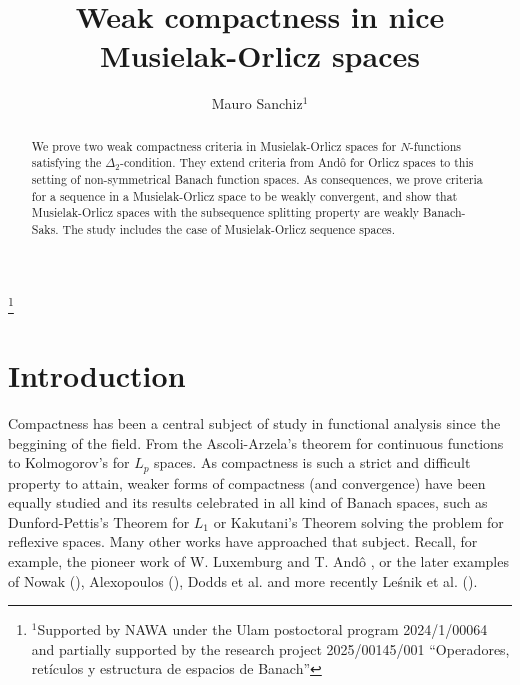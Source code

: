 \documentclass[11pt,a4paper]{amsart}
\begin{document}
\setlength{\baselineskip}{16pt}

\title[Weak compactness in nice Musielak-Orlicz spaces]{Weak compactness in nice Musielak-Orlicz spaces}
\author[M. Sanchiz]{Mauro Sanchiz$^{1}$}
\address{Department of Mathematical Analysis and Applied Mathematics, Faculty of Mathematics, Complutense University of Madrid, 28040 Madrid, Spain.}
\thanks{$^1$Supported by NAWA under the Ulam postoctoral program 2024/1/00064 and partially supported by the research project 2025/00145/001 ``Operadores, retículos y estructura de espacios de Banach''}
\date{}



\begin{abstract}

We prove two weak compactness criteria in Musielak-Orlicz spaces for $N$-functions satisfying the $\Delta_2$-condition. They extend criteria from And\^o for Orlicz spaces to this setting of non-symmetrical Banach function spaces. As consequences, we prove criteria for a sequence in a Musielak-Orlicz space to be weakly convergent, and show that Musielak-Orlicz spaces with the subsequence splitting property are weakly Banach-Saks. The study includes the case of Musielak-Orlicz sequence spaces.

\end{abstract}
\maketitle


\vspace{-10mm}

\section{Introduction}
Compactness has been a central subject of study in functional analysis since the beggining of the field. From the Ascoli-Arzela's theorem for continuous functions to Kolmogorov's for $L_p$ spaces. As compactness is such a strict and difficult property to attain, weaker forms of compactness (and convergence) have been equally studied and its results celebrated in all kind of Banach spaces, such as Dunford-Pettis's Theorem for $L_1$ or Kakutani's Theorem solving the problem for reflexive spaces. Many other works have approached that subject. Recall, for example, the pioneer work of W. Luxemburg \cite{Luxemburg} and T. And\^o \cite{Ando}, or the later examples of Nowak (\cite{Nowak}), Alexopoulos (\cite{Alexopoulos}), Dodds et al. \cite{Dodds} and more recently Le\'{s}nik et al. (\cite{Maligranda}).
\end{document}
